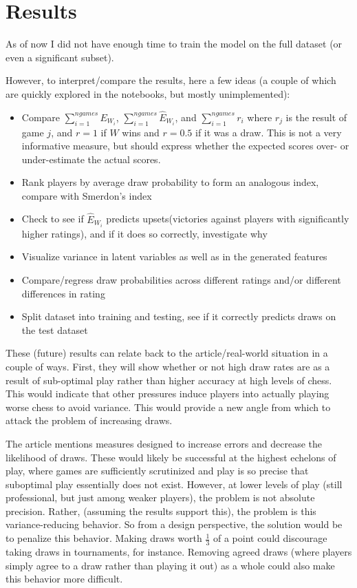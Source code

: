 \documentclass{article}
\begin{document}
\section{Results}
As of now I did not have enough time to train the model on the full dataset (or even a significant subset).

However, to interpret/compare the results, here a few ideas (a couple of which are quickly explored in the notebooks, but mostly unimplemented):
\begin{itemize}
    \item Compare $\sum_{i=1}^{ngames}E_{W_i}$,
        $\sum_{i=1}^{ngames}\hat{E}_{W_i}$, and
        $\sum_{i=1}^{ngames}r_i$ where $r_j$ is the result of game $j$, and $r=1$ if $W$ wins and $r=0.5$ if it was a draw.
        This is not a very informative measure, but should express whether the expected scores over- or under-estimate the actual scores.
    \item Rank players by average draw probability to form an analogous index, compare with Smerdon's index
    \item Check to see if $\hat{E}_{W_i}$ predicts upsets(victories against players with significantly higher ratings), and if it does so correctly, investigate why
    \item Visualize variance in latent variables as well as in the generated features
    \item Compare/regress draw probabilities across different ratings and/or different differences in rating
    \item Split dataset into training and testing, see if it correctly predicts draws on the test dataset
\end{itemize}

These (future) results can relate back to the article/real-world situation in a couple of ways.
First, they will show whether or not high draw rates are as a result of sub-optimal play rather than higher accuracy at high levels of chess.
This would indicate that other pressures induce players into actually playing worse chess to avoid variance.
This would provide a new angle from which to attack the problem of increasing draws.

The article mentions measures designed to increase errors and decrease the likelihood of draws.
These would likely be successful at the highest echelons of play, where games are sufficiently
scrutinized and play is so precise that suboptimal play essentially does not exist.
However, at lower levels of play (still professional, but just among weaker players), the problem is not absolute precision.
Rather, (assuming the results support this), the problem is this variance-reducing behavior.
So from a design perspective, the solution would be to penalize this behavior.
Making draws worth $\frac{1}{3}$ of a point could discourage taking draws in tournaments, for instance.
Removing agreed draws (where players simply agree to a draw rather than playing it out) as a whole could also make this behavior more difficult.
\end{document}
